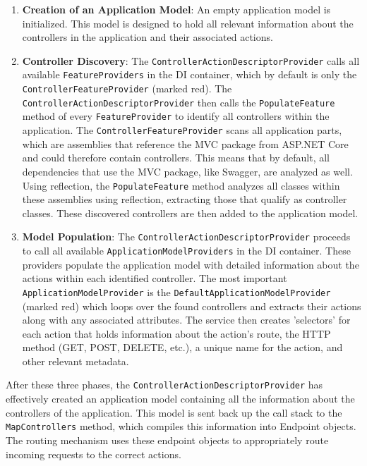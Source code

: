 \begin{enumerate}
    \item \textbf{Creation of an Application Model}: An empty application model is initialized. This model is designed to hold all relevant information about the controllers in the application and their associated actions.

    \item \textbf{Controller Discovery}: The \verb|ControllerActionDescriptorProvider| calls all available \verb|FeatureProviders| in the DI container, which by default is only the \verb|ControllerFeatureProvider| (marked red). The \verb|ControllerActionDescriptorProvider| then calls the \verb|PopulateFeature| method of every \verb|FeatureProvider| to identify all controllers within the application. The \verb|ControllerFeatureProvider| scans all application parts, which are assemblies that reference the MVC package from ASP.NET Core and could therefore contain controllers. This means that by default, all dependencies that use the MVC package, like Swagger, are analyzed as well. Using reflection, the \verb|PopulateFeature| method analyzes all classes within these assemblies using reflection, extracting those that qualify as controller classes. These discovered controllers are then added to the application model.

    \item \textbf{Model Population}: The \verb|ControllerActionDescriptorProvider| proceeds to call all available \verb|ApplicationModelProviders| in the DI container. These providers populate the application model with detailed information about the actions within each identified controller. The most important \verb|ApplicationModelProvider| is the \verb|DefaultApplicationModelProvider| (marked red) which loops over the found controllers and extracts their actions along with any associated attributes. The service then creates 'selectors' for each action that holds information about the action's route, the HTTP method (GET, POST, DELETE, etc.), a unique name for the action, and other relevant metadata.
\end{enumerate}

After these three phases, the \verb|ControllerActionDescriptorProvider| has effectively created an application model containing all the information about the controllers of the application. This model is sent back up the call stack to the \verb|MapControllers| method, which compiles this information into Endpoint objects. The routing mechanism uses these endpoint objects to appropriately route incoming requests to the correct actions.

